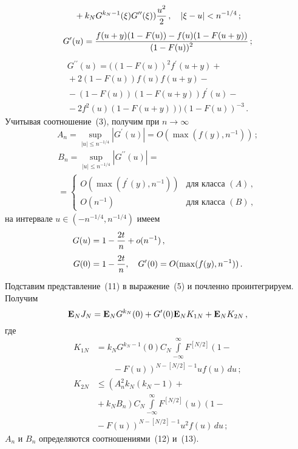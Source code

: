 \begin{multicols}{2}
\begin{multline}
{}+k_{N}G^{k_{N}-1}(\xi)G^{\prime \prime}(\xi))\displaystyle\frac{\displaystyle u^2\mathstrut}{\displaystyle 2\mathstrut}\,, \quad
|\xi-u|<n^{-1/4}\,; \label{11}
\end{multline}
$$
G^{\prime}(u)=\displaystyle\frac{\displaystyle f(u+y)(1-F(u))-f(u)(1-F(u+y))\mathstrut}{\displaystyle (1-F(u))^2\mathstrut}\,;
$$
\begin{multline*}
G^{\prime \prime}(u)=((1-F(u))^2f^{\prime}(u+y)+{}\\
{}+2(1-F(u))f(u)f(u+y)-{}\\
{}-(1-F(u))(1-F(u+y))f^{\prime} (u)-{}\\
{}- 2f^2(u)(1-F(u+y)))(1-F(u))^{-3}\,.
\end{multline*} 
Учитывая соотношение~(3), получим при $n \to \infty$ 
\begin{equation}
A_n=\sup_{|u|\leq n^{-1/4}}|G^{\prime}(u)|=O(\max (f(y),n^{-1}))\,; 
\label{12}
\end{equation}
\begin{multline}
B_n=\sup_{|u|\leq n^{-1/4}}|G^{\prime \prime }(u)|={}\\
{}=
\begin{cases} 
O(\max(f^{\prime}(y),n^{-1})) & \mbox{для
класса $(A)$}\,, \\ 
O(n^{-1}) & \mbox {для класса $(B)$}\,, 
\end{cases}
\label{13}
\end{multline} 
на интервале $u\in (-n^{-1/4},n^{-1/4})$ имеем
\begin{align}
G(u)&=1-\displaystyle\frac{\displaystyle 2t\mathstrut}{\displaystyle n\mathstrut}+o(n^{-1})\,,\notag\\
G(0)&=1-\displaystyle\frac{\displaystyle 2t\mathstrut}{\displaystyle n\mathstrut}, \quad
G^{\prime}(0)=O(\max(f(y),n^{-1}))\,. \label{14}
\end{align}
Подставим представление~(11) в выражение~(5) и почленно проинтегрируем.
Получим 
\begin{equation}
{\bf E}_NJ_N={\bf E}_NG^{k_N}(0)+G^{\prime}(0){\bf E}_N
K_{1N}+{\bf E}_N K_{2N}\,, \label{15}
\end{equation} 
где 
\begin{align*}
K_{1N}&= k_NG^{k_N-1}(0)C_N \int\limits_{-\infty}^{\infty}F^{[N/2]}\left(1-{}\right.\\
&\ \ \ \ \ \ \ \ \ \left.{}-F(u)\right )^{N-[N/2]-1}uf(u)\,du\,;
\\
K_{2N}&\leq
\left ( A_n^2k_N(k_N-1)+{}\right.\\
&{}+\left.k_NB_n\right )C_N\int\limits_{-\infty}^{\infty}F^{[N/2]}(u)\left (1-{}\right.\\
&\left. {}- F(u)\right )^{N-[N/2]-1}u^2f(u)\,du\,;
\end{align*} 
$A_n$ и $B_n$ определяются соотношениями~(12) и~(13).


\end{multicols}
